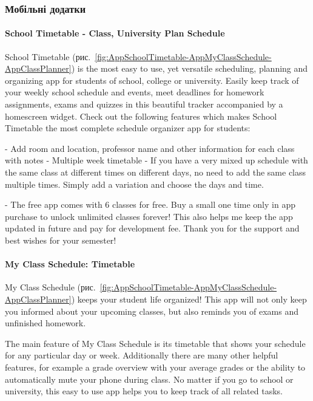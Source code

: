 \subsubsection{Мобільні додатки}

\paragraph{School Timetable - Class, University Plan Schedule}


School Timetable (рис.~\ref{fig:AppSchoolTimetable-AppMyClassSchedule-AppClassPlanner}) is the most easy to use, yet versatile scheduling, planning and organizing app for students of school, college or university. Easily keep track of your weekly school schedule and events, meet deadlines for homework assignments, exams and quizzes in this beautiful tracker accompanied by a homescreen widget. Check out the following features which makes School Timetable the most complete schedule organizer app for students:

- Add room and location, professor name and other information for each class with notes
- Multiple week timetable
- If you have a very mixed up schedule with the same class at different times on different days, no need to add the same class multiple times. Simply add a variation and choose the days and time.

- The free app comes with 6 classes for free. Buy a small one time only in app purchase to unlock unlimited classes forever! This also helps me keep the app updated in future and pay for development fee. Thank you for the support and best wishes for your semester!

\paragraph{My Class Schedule: Timetable}

My Class Schedule (рис.~\ref{fig:AppSchoolTimetable-AppMyClassSchedule-AppClassPlanner}) keeps your student life organized!
This app will not only keep you informed about your upcoming classes, but also reminds you of exams and unfinished homework.

The main feature of My Class Schedule is its timetable that shows your schedule for any particular day or week. Additionally there are many other helpful features, for example a grade overview with your average grades or the ability to automatically mute your phone during class.
No matter if you go to school or university, this easy to use app helps you to keep track of all related tasks.

